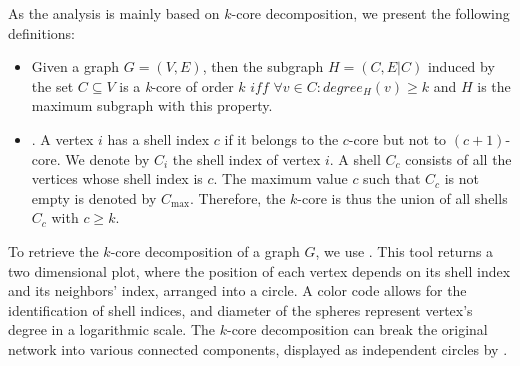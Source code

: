

As the analysis is mainly based on $k$-core decomposition, we present the
following definitions:
\begin{itemize}
  \item{} Given a graph $G=(V,E)$, then the
  subgraph $H=(C,E|C)$ induced by the set $ C\subseteq V$ is a \textit{k}-core
  of order $k$ $iff$ $\forall v \in C: degree_{H}(v)\geq k$ and $H$ is the
  maximum subgraph with this property.
  \item{}. A vertex $i$ has a shell index $c$ if it
  belongs to the $c$-core but not to $(c+1)$-core. We denote by $C_i$ the shell
  index of vertex $i$. A shell $C_c$ consists of all the vertices whose shell
  index is $c$. The maximum value $c$ such that $C_c$ is not empty is denoted by
  $C_{\max}$.  Therefore, the $k$-core is thus the union of all shells $C_c$ with
  $c \geq k$.
\end{itemize}

To retrieve the $k$-core decomposition of a graph $G$, we use
\lanet\cite{Alvarez06k}.  
This tool returns a two dimensional plot, where the position of each vertex depends on its shell index and its neighbors' index, arranged into a circle. 
A color code allows for the identification of shell indices, and diameter of the spheres represent vertex's degree in a logarithmic scale. 
The $k$-core decomposition can break the original network into various connected components, displayed as independent circles by \lanet.


